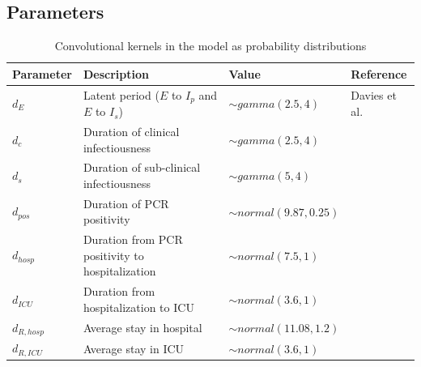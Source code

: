 \documentclass[12pt]{article}
\begin{document}
\newpage 
\subsection{Parameters}

\begin{center}
    \begin{table}[h]
    \caption{Convolutional kernels in the model as probability distributions}
    \centering
\begin{tabular}[H]{p{2cm}p{6cm}p{4cm}p{4cm}}
     \textbf{Parameter}& \textbf{Description}  & \textbf{Value}& \textbf{Reference} \\
     \midrule
     $d_E$ & Latent period ($E$ to $I_p$ and $E$ to $I_s$) & $\sim gamma(2.5,4)$ & Davies et al.\\
     $d_c$ & Duration of clinical infectiousness& $\sim gamma(2.5,4)$ &  \\
     $d_s$ & Duration of sub-clinical infectiousness& $\sim gamma(5,4)$ &  \\
     $d_{pos}$ & Duration of PCR positivity& $\sim normal(9.87, 0.25)$ & \\ 
     $d_{hosp}$ & Duration from PCR positivity to hospitalization& $\sim normal(7.5, 1)$ & \\ 
     $d_{ICU}$ & Duration from hospitalization to ICU& $\sim normal(3.6, 1)$ & \\ 
     $d_{R,hosp}$ & Average stay in hospital& $\sim normal(11.08, 1.2)$ & \\ 
     $d_{R,ICU}$ & Average stay in ICU & $\sim normal(3.6, 1)$ & \\ 
\end{tabular}
\end{table}
\end{center}
\end{document}
